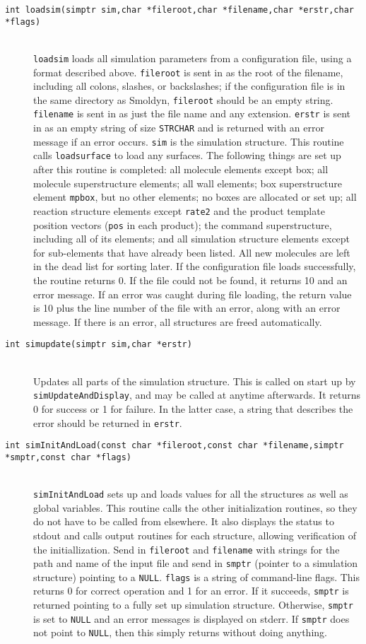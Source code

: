 \documentclass {book}
\newcommand {\ttt} {\texttt}
\begin{document}
\begin{description}
\item[\ttt{int loadsim(simptr sim,char *fileroot,char *filename,char *erstr,char *flags)}]
\hfill \\
\ttt{loadsim} loads all simulation parameters from a configuration file, using a format described above. \ttt{fileroot} is sent in as the root of the filename, including all colons, slashes, or backslashes; if the configuration file is in the same directory as Smoldyn, \ttt{fileroot} should be an empty string. \ttt{filename} is sent in as just the file name and any extension. \ttt{erstr} is sent in as an empty string of size \ttt{STRCHAR} and is returned with an error message if an error occurs. \ttt{sim} is the simulation structure. This routine calls \ttt{loadsurface} to load any surfaces. The following things are set up after this routine is completed: all molecule elements except box; all molecule superstructure elements; all wall elements; box superstructure element \ttt{mpbox}, but no other elements; no boxes are allocated or set up; all reaction structure elements except \ttt{rate2} and the product template position vectors (\ttt{pos} in each product); the command superstructure, including all of its elements; and all simulation structure elements except for sub-elements that have already been listed. All new molecules are left in the dead list for sorting later. If the configuration file loads successfully, the routine returns 0. If the file could not be found, it returns 10 and an error message. If an error was caught during file loading, the return value is 10 plus the line number of the file with an error, along with an error message. If there is an error, all structures are freed automatically.

\item[\ttt{int simupdate(simptr sim,char *erstr)}]
\hfill \\
Updates all parts of the simulation structure. This is called on start up by \ttt{simUpdateAndDisplay}, and may be called at anytime afterwards. It returns 0 for success or 1 for failure. In the latter case, a string that describes the error should be returned in \ttt{erstr}.

\item[\ttt{int simInitAndLoad(const char *fileroot,const char *filename,simptr *smptr,const char *flags)}]
\hfill \\
\ttt{simInitAndLoad} sets up and loads values for all the structures as well as global variables. This routine calls the other initialization routines, so they do not have to be called from elsewhere. It also displays the status to stdout and calls output routines for each structure, allowing verification of the initiallization. Send in \ttt{fileroot} and \ttt{filename} with strings for the path and name of the input file and send in \ttt{smptr} (pointer to a simulation structure) pointing to a \ttt{NULL}. \ttt{flags} is a string of command-line flags. This returns 0 for correct operation and 1 for an error. If it succeeds, \ttt{smptr} is returned pointing to a fully set up simulation structure. Otherwise, \ttt{smptr} is set to \ttt{NULL} and an error messages is displayed on stderr. If \ttt{smptr} does not point to \ttt{NULL}, then this simply returns without doing anything.


\end{description}
\end{document}
